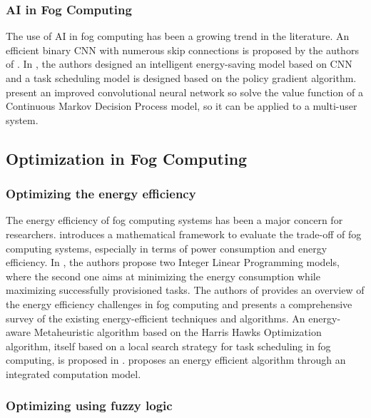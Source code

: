 \subsubsection*{AI in Fog Computing}
\label{subsec:ai-in-fogcomputing}

The use of AI in fog computing has been a growing trend in the literature. An efficient binary CNN with numerous skip
connections is proposed by the authors of \cite{wu-et-al-2021}. In \cite{yang-et-al-2022}, the authors designed an
intelligent energy-saving model based on CNN and a task scheduling model is designed based on the policy gradient
algorithm. \cite{jing-xue-2023} present an improved convolutional neural network so solve the value function of a
Continuous Markov Decision Process model, so it can be applied to a multi-user system.

\subsection{Optimization in Fog Computing}
\label{subsec:optimization-in-fogcomputing}

\subsubsection*{Optimizing the energy efficiency}
\label{subsec:energy-efficiency}

The energy efficiency of fog computing systems has been a major concern for researchers. \cite{alhumaima-2020}
introduces a mathematical framework to evaluate the trade-off of fog computing systems, especially in terms of power
consumption and energy efficiency. In \cite{he-et-al-2020}, the authors propose two Integer Linear Programming models,
where the second one aims at minimizing the energy consumption while maximizing successfully provisioned tasks. The
authors of \cite{malik-et-al-2022} provides an overview of the energy efficiency challenges in fog computing and
presents a comprehensive survey of the existing energy-efficient techniques and algorithms. An energy-aware
Metaheuristic algorithm based on the Harris Hawks Optimization algorithm, itself based on a local search strategy for
task scheduling in fog computing, is proposed in \cite{abdel-basset-et-al-2021}. \cite{wang-et-al-2023} proposes an
energy efficient algorithm through an integrated computation model.

\subsubsection*{Optimizing using fuzzy logic}
\label{subsubsec:fuzzy-logic}

